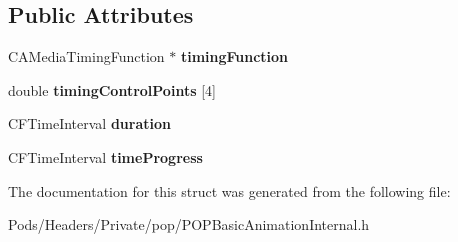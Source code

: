 \subsection*{Public Attributes}
\begin{DoxyCompactItemize}
\item 
\mbox{\label{struct___p_o_p_basic_animation_state_a96f4f762c714c2113a73064b1bb207c9}} 
C\+A\+Media\+Timing\+Function $\ast$ {\bfseries timing\+Function}
\item 
\mbox{\label{struct___p_o_p_basic_animation_state_a74603c620e316def27a184ec503e4335}} 
double {\bfseries timing\+Control\+Points} \mbox{[}4\mbox{]}
\item 
\mbox{\label{struct___p_o_p_basic_animation_state_ad8a4d83eedbabef51d323982453a87c3}} 
C\+F\+Time\+Interval {\bfseries duration}
\item 
\mbox{\label{struct___p_o_p_basic_animation_state_a6bc9af434576660f41a91f968a288376}} 
C\+F\+Time\+Interval {\bfseries time\+Progress}
\end{DoxyCompactItemize}


The documentation for this struct was generated from the following file\+:\begin{DoxyCompactItemize}
\item 
Pods/\+Headers/\+Private/pop/P\+O\+P\+Basic\+Animation\+Internal.\+h\end{DoxyCompactItemize}
